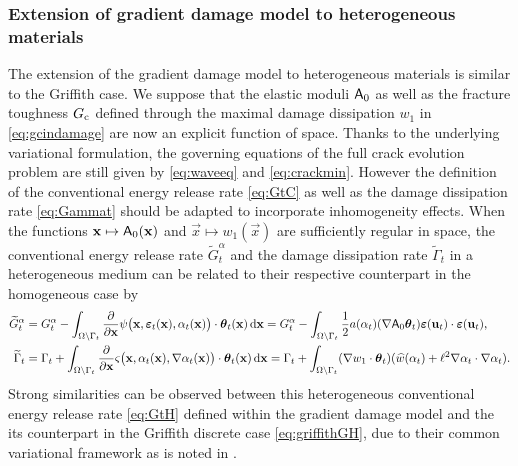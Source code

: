 \subsubsection{Extension of gradient damage model to heterogeneous materials} \label{sec:graddamaH}
The extension of the gradient damage model to heterogeneous materials is similar to the Griffith case. We suppose that the elastic moduli $\mathsf{A}_0$ as well as the fracture toughness $G_\mathrm{c}$ defined through the maximal damage dissipation $w_1$ in \eqref{eq:gcindamage} are now an explicit function of space. Thanks to the underlying variational formulation, the governing equations of the full crack evolution problem are still given by \eqref{eq:waveeq} and \eqref{eq:crackmin}. However the definition of the conventional energy release rate \eqref{eq:GtC} as well as the damage dissipation rate \eqref{eq:Gammat} should be adapted to incorporate inhomogeneity effects. When the functions $\vec{x}\mapsto\tens{A}_0(\vec{x})$ and $\vec{x}\mapsto w_1(\vec{x})$ are sufficiently regular in space, the conventional energy release rate $\widetilde{G}_t^{\alpha}$ and the damage dissipation rate $\widetilde{\Gamma}_t$ in a heterogeneous medium can be related to their respective counterpart in the homogeneous case by 
\begin{align}
\widetilde{G}_t^\alpha &= G_t^\alpha-\int_\domaint\frac{\partial}{\partial\vec{x}}\psi\bigl(\vec{x},\eps_t(\vec{x}),\alpha_t(\vec{x})\bigr)\cdot\vtheta_t(\vec{x})\D{\vec{x}}=G_t^\alpha-\int_\domaint\frac{1}{2}a(\alpha_t)(\nabla\tens{A}_0\vtheta_t)\eps(\vec{u}_t)\cdot\eps(\vec{u}_t), \label{eq:GtH} \\
\widetilde{\Gamma}_t &= \Gamma_t+\int_\domaint\frac{\partial}{\partial\vec{x}}\varsigma\bigl(\vec{x},\alpha_t(\vec{x}),\nabla\alpha_t(\vec{x})\bigr)\cdot\vtheta_t(\vec{x})\D{\vec{x}}=\Gamma_t+\int_\domaint(\nabla w_1\cdot\vtheta_t)(\widehat{w}(\alpha_t)+\ell^2\nabla\alpha_t\cdot\nabla\alpha_t). \label{eq:GammaH}
\end{align}
Strong similarities can be observed between this heterogeneous conventional energy release rate \eqref{eq:GtH} defined within the gradient damage model and the its counterpart in the Griffith discrete case \eqref{eq:griffithGH}, due to their common variational framework as is noted in \cite{LiMarigo:2015}.

